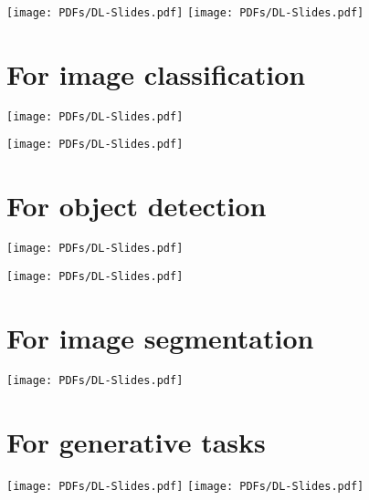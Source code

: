 \texttt{[image: PDFs/DL-Slides.pdf]}
\newpage
\texttt{[image: PDFs/DL-Slides.pdf]}

\section{For image classification}
\texttt{[image: PDFs/DL-Slides.pdf]}

\texttt{[image: PDFs/DL-Slides.pdf]}


\section{For object detection}
\texttt{[image: PDFs/DL-Slides.pdf]}

\texttt{[image: PDFs/DL-Slides.pdf]}
\section{For image segmentation}
\texttt{[image: PDFs/DL-Slides.pdf]}

\section{For generative tasks}
\texttt{[image: PDFs/DL-Slides.pdf]}
\newpage
\texttt{[image: PDFs/DL-Slides.pdf]}
\pagebreak